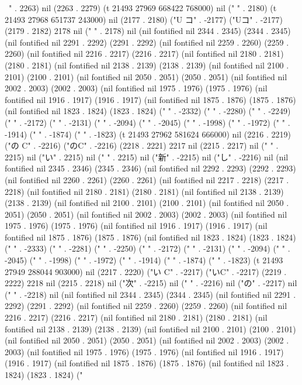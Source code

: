 \
" . 2263) nil (2263 . 2279) (t 21493 27969 668422 768000) nil ("
" . 2180) (t 21493 27968 651737 243000) nil (2177 . 2180) ("U コ" . -2177) ("Uコ" . -2177) (2179 . 2182) 2178 nil (" " . 2178) nil (nil fontified nil 2344 . 2345) (2344 . 2345) (nil fontified nil 2291 . 2292) (2291 . 2292) (nil fontified nil 2259 . 2260) (2259 . 2260) (nil fontified nil 2216 . 2217) (2216 . 2217) (nil fontified nil 2180 . 2181) (2180 . 2181) (nil fontified nil 2138 . 2139) (2138 . 2139) (nil fontified nil 2100 . 2101) (2100 . 2101) (nil fontified nil 2050 . 2051) (2050 . 2051) (nil fontified nil 2002 . 2003) (2002 . 2003) (nil fontified nil 1975 . 1976) (1975 . 1976) (nil fontified nil 1916 . 1917) (1916 . 1917) (nil fontified nil 1875 . 1876) (1875 . 1876) (nil fontified nil 1823 . 1824) (1823 . 1824) ("
" . -2332) ("
" . -2280) ("
" . -2249) ("
" . -2172) ("
" . -2131) ("
" . -2094) ("
" . -2045) ("
" . -1998) ("
" . -1972) ("
" . -1914) ("
" . -1874) ("
" . -1823) (t 21493 27962 581624 666000) nil (2216 . 2219) ("の C" . -2216) ("のC" . -2216) (2218 . 2221) 2217 nil (2215 . 2217) nil (" " . 2215) nil ("い" . 2215) nil ("
" . 2215) nil ("新" . -2215) nil ("し" . -2216) nil (nil fontified nil 2345 . 2346) (2345 . 2346) (nil fontified nil 2292 . 2293) (2292 . 2293) (nil fontified nil 2260 . 2261) (2260 . 2261) (nil fontified nil 2217 . 2218) (2217 . 2218) (nil fontified nil 2180 . 2181) (2180 . 2181) (nil fontified nil 2138 . 2139) (2138 . 2139) (nil fontified nil 2100 . 2101) (2100 . 2101) (nil fontified nil 2050 . 2051) (2050 . 2051) (nil fontified nil 2002 . 2003) (2002 . 2003) (nil fontified nil 1975 . 1976) (1975 . 1976) (nil fontified nil 1916 . 1917) (1916 . 1917) (nil fontified nil 1875 . 1876) (1875 . 1876) (nil fontified nil 1823 . 1824) (1823 . 1824) ("
" . -2333) ("
" . -2281) ("
" . -2250) ("
" . -2172) ("
" . -2131) ("
" . -2094) ("
" . -2045) ("
" . -1998) ("
" . -1972) ("
" . -1914) ("
" . -1874) ("
" . -1823) (t 21493 27949 288044 903000) nil (2217 . 2220) ("い C" . -2217) ("いC" . -2217) (2219 . 2222) 2218 nil (2215 . 2218) nil ("次" . -2215) nil ("
" . -2216) nil ("の" . -2217) nil (" " . -2218) nil (nil fontified nil 2344 . 2345) (2344 . 2345) (nil fontified nil 2291 . 2292) (2291 . 2292) (nil fontified nil 2259 . 2260) (2259 . 2260) (nil fontified nil 2216 . 2217) (2216 . 2217) (nil fontified nil 2180 . 2181) (2180 . 2181) (nil fontified nil 2138 . 2139) (2138 . 2139) (nil fontified nil 2100 . 2101) (2100 . 2101) (nil fontified nil 2050 . 2051) (2050 . 2051) (nil fontified nil 2002 . 2003) (2002 . 2003) (nil fontified nil 1975 . 1976) (1975 . 1976) (nil fontified nil 1916 . 1917) (1916 . 1917) (nil fontified nil 1875 . 1876) (1875 . 1876) (nil fontified nil 1823 . 1824) (1823 . 1824) ("
